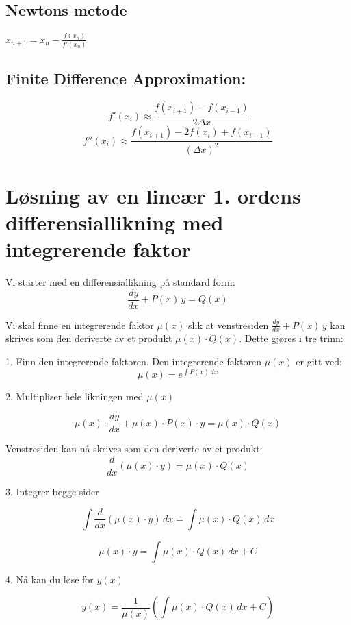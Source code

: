 \documentclass[a4paper,7pt,fleqn]{article}
\begin{document}
\begin{multicols}{2}
\subsection{Newtons metode}  

\( x_{n+1} = x_n - \frac{f(x_n)}{f'(x_n)} \)  

\subsection{Finite Difference Approximation:}
\[
\ f'(x_i) \approx  \frac{f(x_{i+1}) - f(x_{i-1})}{2\Delta x}
\]
\[
f''(x_i) \approx  \frac{f(x_{i+1}) - 2f(x_i) + f(x_{i-1})}{(\Delta x)^2}
\]

\end{multicols}





\newpage

\section{Løsning av en lineær 1. ordens differensiallikning med integrerende faktor}

Vi starter med en differensiallikning på standard form:
\[
\frac{dy}{dx} + P(x)\, y = Q(x)
\]

Vi skal finne en integrerende faktor $\mu(x)$ slik at venstresiden \(\frac{dy}{dx} + P(x)\, y\) kan skrives som den deriverte av et produkt \(\mu(x) \cdot Q(x)\). Dette gjøres i tre trinn:
\vspace{0.5cm}

1. Finn den integrerende faktoren. Den integrerende faktoren $\mu(x)$ er gitt ved:
\[
\mu(x) = e^{\int P(x)\,dx}
\]

2. Multipliser hele likningen med $\mu(x)$

\[
\mu(x) \cdot \frac{dy}{dx} + \mu(x) \cdot P(x) \cdot y = \mu(x) \cdot Q(x)
\]

Venstresiden kan nå skrives som den deriverte av et produkt:
\[
\frac{d}{dx} \left( \mu(x) \cdot y \right) = \mu(x) \cdot Q(x)
\]

3. Integrer begge sider

\[
\int \frac{d}{dx} \left( \mu(x) \cdot y \right)\,dx = \int \mu(x) \cdot Q(x)\,dx
\]

\[
\mu(x) \cdot y = \int \mu(x) \cdot Q(x)\,dx + C
\]

4. Nå kan du løse for $y(x)$

\[
y(x) = \frac{1}{\mu(x)} \left( \int \mu(x) \cdot Q(x)\,dx + C \right)
\]
\end{document}
